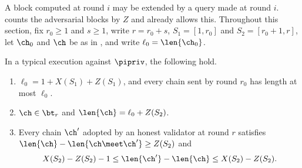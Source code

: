 A block computed at round $i$ may be extended by a query made at round $i$.
 counts the adversarial blocks by $Z$ and already allows
this. Throughout this section, fix $r_0\ge1$ and $s\ge1$, write $r=r_0+s$,
$S_1=[1,r_0]$ and $S_2=[r_0+1,r]$, let $\ch_0$ and $\ch$ be as in
, and write $\ell_0=\len{\ch_0}$.

\begin{lemma}\label{lem.attack}
    In a typical execution against $\pipriv$, the following hold.
    \begin{enumerate}
        \item $\ell_0=1+X(S_1)+Z(S_1)$, and every chain sent by round $r_0$
            has length at most $\ell_0$.
        \item $\ch\in\bt_r$ and $\len{\ch}=\ell_0+Z(S_2)$.
        \item Every chain $\ch'$ adopted by an honest validator at round $r$
            satisfies $\len{\ch}-\len{\ch\meet\ch'}\ge Z(S_2)$ and
            \[
                X(S_2)-Z(S_2)-1 \le \len{\ch'}-\len{\ch} \le X(S_2)-Z(S_2) .
            \]
    \end{enumerate}
\end{lemma}
